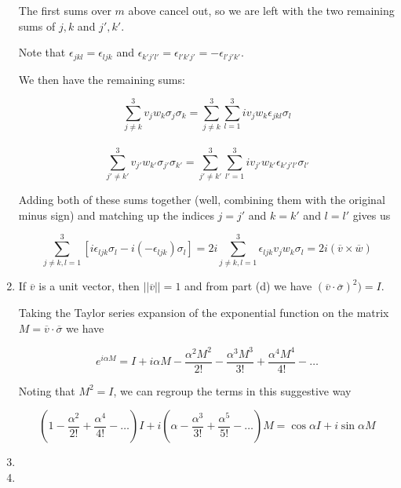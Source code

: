 \documentclass[12pt]{article}
\begin{document}
\begin{enumerate}
The first sums over $m$ above cancel out, so we are left with the two
remaining sums of $j,k$ and $j',k'$.

Note that $\epsilon_{jkl} = \epsilon_{ljk}$ and $\epsilon_{k'j'l'} = \epsilon_{l'k'j'} = -\epsilon_{l'j'k'}$.

We then have the remaining sums:

\begin{equation}
\sum_{j\ne k}^3 v_j w_k \sigma_j \sigma_k = \sum_{j \ne k}^3 \sum_{l=1}^3 i v_j w_k \epsilon_{jkl} \sigma_l
\end{equation}
\
\begin{equation}
\sum_{j'\ne k'}^3 v_{j'} w_{k'} \sigma_{j'} \sigma_{k'} = \sum_{j' \ne k'}^3 \sum_{l'=1}^3 i v_{j'} w_{k'} \epsilon_{k'j'l'} \sigma_{l'}
\end{equation}

Adding both of these sums together (well, combining them with the original minus sign)
and matching up the indices
$j=j'$ and $k=k'$ and $l=l'$ gives us

\begin{equation}
\sum_{j \ne k, l=1}^3 \left[ i\epsilon_{ljk}\sigma_l - i(-\epsilon_{ljk})\sigma_l \right] =
2i \sum_{j \ne k, l=1}^3 \epsilon_{ljk} v_j w_k \sigma_l = 2i(\overline{v}\times \overline{w})
\end{equation}

\item
If $\overline{v}$ is a unit vector, then $||\overline{v}||=1$ and from part (d)
we have $(\overline{v}\cdot \overline{\sigma})^2) = I$.

Taking the Taylor series expansion of the exponential function on the
matrix $M=\overline{v}\cdot\overline{\sigma}$ we have

\begin{equation}
e^{i\alpha M} = I + i\alpha M - \frac{\alpha^2 M^2}{2!} - \frac{\alpha^3 M^3}{3!} +
\frac{\alpha^4 M^4}{4!} - \ldots
\end{equation}

Noting that $M^2 = I$, we can regroup the terms in this suggestive way

\begin{equation}
\left( 1 - \frac{\alpha^2}{2!} + \frac{\alpha^4}{4!} - \ldots \right) I +
i \left(\alpha - \frac{\alpha^3}{3!} + \frac{\alpha^5}{5!} - \ldots \right) M
= \cos{\alpha}I + i\sin{\alpha}M
\end{equation}

\item

\item

\end{enumerate}
\end{document}
